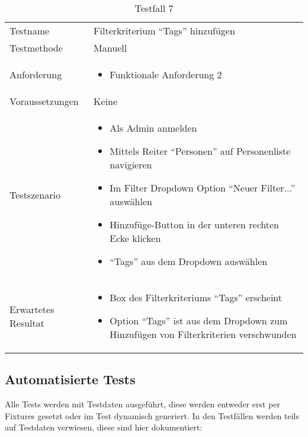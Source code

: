 \begin{table}[h!]
   \begin{tabular}{|L{0.4\textwidth}|L{0.6\textwidth}|}
       \hline
         \\[12pt]
       \hline
        Testname & Filterkriterium ``Tags'' hinzufügen \\
       \hline
       Testmethode & Manuell \\
       \hline
        Anforderung & 
        \begin{itemize}
         \item Funktionale Anforderung 2
         \end{itemize}  \\
       \hline
       Voraussetzungen & Keine \\
       \hline
       Testszenario & 
       \begin{itemize}
         \item Als Admin anmelden
         \item Mittels Reiter ``Personen'' auf Personenliste navigieren
         \item Im Filter Dropdown Option ``Neuer Filter...'' auswählen
         \item Hinzufüge-Button in der unteren rechten Ecke klicken
         \item ``Tags'' aus dem Dropdown auswählen
       \end{itemize} \\
       \hline
       Erwartetes Resultat & 
       \begin{itemize}
         \item Box des Filterkriteriums ``Tags'' erscheint
         \item Option ``Tags'' ist aus dem Dropdown zum Hinzufügen von Filterkriterien verschwunden
       \end{itemize} \\
     \hline
     \end{tabular}
     \caption{Testfall 7}
\end{table}

\newpage

\subsection{Automatisierte Tests}
Alle Tests werden mit Testdaten ausgeführt, diese werden entweder erst per Fixtures gesetzt oder im Test dynamisch generiert.
In den Testfällen werden teils auf Testdaten verwiesen, diese sind hier dokumentiert:

